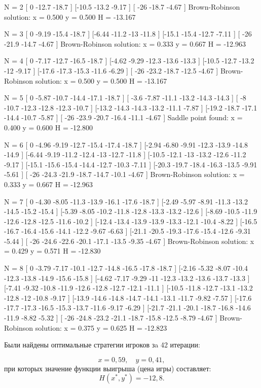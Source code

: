 \begin{center}
\label{fig:fig2}
\begin{codelisting}
N = 2
[    0  -12.7  -18.7 ]
[-10.5  -13.2  -9.17 ]
[  -26  -18.7  -4.67 ]
Brown-Robinson solution:
x = 0.500 y = 0.500 H = -13.167

N = 3
[    0  -9.19  -15.4  -18.7 ]
[-6.44  -11.2   -13   -11.8 ]
[-15.1  -15.4  -12.7  -7.11 ]
[  -26  -21.9  -14.7  -4.67 ]
Brown-Robinson solution:
x = 0.333 y = 0.667 H = -12.963

N = 4
[    0  -7.17  -12.7  -16.5  -18.7 ]
[-4.62  -9.29  -12.3  -13.6  -13.3 ]
[-10.5  -12.7  -13.2   -12   -9.17 ]
[-17.6  -17.3  -15.3  -11.6  -6.29 ]
[  -26  -23.2  -18.7  -12.5  -4.67 ]
Brown-Robinson solution:
x = 0.500 y = 0.500 H = -13.167

N = 5
[    0  -5.87  -10.7  -14.4  -17.1  -18.7 ]
[ -3.6  -7.87  -11.1  -13.2  -14.3  -14.3 ]
[   -8  -10.7  -12.3  -12.8  -12.3  -10.7 ]
[-13.2  -14.3  -14.3  -13.2  -11.1  -7.87 ]
[-19.2  -18.7  -17.1  -14.4  -10.7  -5.87 ]
[  -26  -23.9  -20.7  -16.4  -11.1  -4.67 ]
Saddle point found:
x = 0.400 y = 0.600 H = -12.800

N = 6
[    0  -4.96  -9.19  -12.7  -15.4  -17.4  -18.7 ]
[-2.94  -6.80  -9.91  -12.3  -13.9  -14.8  -14.9 ]
[-6.44  -9.19  -11.2  -12.4   -13   -12.7  -11.8 ]
[-10.5  -12.1   -13   -13.2  -12.6  -11.2  -9.17 ]
[-15.1  -15.6  -15.4  -14.4  -12.7  -10.3  -7.11 ]
[-20.3  -19.7  -18.4  -16.3  -13.5  -9.91  -5.61 ]
[  -26  -24.3  -21.9  -18.7  -14.7  -10.1  -4.67 ]
Brown-Robinson solution:
x = 0.333 y = 0.667 H = -12.963

N = 7
[    0  -4.30  -8.05  -11.3  -13.9  -16.1  -17.6  -18.7 ]
[-2.49  -5.97  -8.91  -11.3  -13.2  -14.5  -15.2  -15.4 ]
[-5.39  -8.05  -10.2  -11.8  -12.8  -13.3  -13.2  -12.6 ]
[-8.69  -10.5  -11.9  -12.6  -12.8  -12.5  -11.6  -10.2 ]
[-12.4  -13.4  -13.9  -13.9  -13.3  -12.1  -10.4  -8.22 ]
[-16.5  -16.7  -16.4  -15.6  -14.1  -12.2  -9.67  -6.63 ]
[-21.1  -20.5  -19.3  -17.6  -15.4  -12.6  -9.31  -5.44 ]
[  -26  -24.6  -22.6  -20.1  -17.1  -13.5  -9.35  -4.67 ]
Brown-Robinson solution:
x = 0.429 y = 0.571 H = -12.830

N = 8
[    0  -3.79  -7.17  -10.1  -12.7  -14.8  -16.5  -17.8  -18.7 ]
[-2.16  -5.32  -8.07  -10.4  -12.3  -13.8  -14.9  -15.6  -15.8 ]
[-4.62  -7.17  -9.29   -11   -12.3  -13.2  -13.6  -13.7  -13.3 ]
[-7.41  -9.32  -10.8  -11.9  -12.6  -12.8  -12.7  -12.1  -11.1 ]
[-10.5  -11.8  -12.7  -13.1  -13.2  -12.8   -12   -10.8  -9.17 ]
[-13.9  -14.6  -14.8  -14.7  -14.1  -13.1  -11.7  -9.82  -7.57 ]
[-17.6  -17.7  -17.3  -16.5  -15.3  -13.7  -11.6  -9.17  -6.29 ]
[-21.7  -21.1  -20.1  -18.7  -16.8  -14.6  -11.9  -8.82  -5.32 ]
[  -26  -24.8  -23.2  -21.1  -18.7  -15.8  -12.5  -8.79  -4.67 ]
Brown-Robinson solution:
x = 0.375 y = 0.625 H = -12.823
\end{codelisting}
\end{center}

Были найдены оптимальные стратегии игроков зa 42 итерации:

\[
x = 0{,}59, \quad y = 0{,}41,
\]
при которых значение функции выигрыша (цена игры) составляет:
\[
H(x^*, y^*) = -12{,}8.
\]
